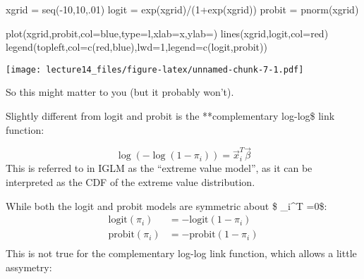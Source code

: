 \documentclass[
]{article}
\newenvironment{Shaded}{\begin{snugshade}}{\end{snugshade}}
\newcommand{\AttributeTok}[1]{\textcolor[rgb]{0.77,0.63,0.00}{#1}}
\newcommand{\DecValTok}[1]{\textcolor[rgb]{0.00,0.00,0.81}{#1}}
\newcommand{\FunctionTok}[1]{\textcolor[rgb]{0.00,0.00,0.00}{#1}}
\newcommand{\NormalTok}[1]{#1}
\newcommand{\OtherTok}[1]{\textcolor[rgb]{0.56,0.35,0.01}{#1}}
\newcommand{\SpecialCharTok}[1]{\textcolor[rgb]{0.00,0.00,0.00}{#1}}
\newcommand{\StringTok}[1]{\textcolor[rgb]{0.31,0.60,0.02}{#1}}
\begin{document}
\begin{Shaded}
\begin{Highlighting}[]
\NormalTok{xgrid }\OtherTok{=} \FunctionTok{seq}\NormalTok{(}\SpecialCharTok{{-}}\DecValTok{10}\NormalTok{,}\DecValTok{10}\NormalTok{,.}\DecValTok{01}\NormalTok{)}
\NormalTok{logit }\OtherTok{=} \FunctionTok{exp}\NormalTok{(xgrid)}\SpecialCharTok{/}\NormalTok{(}\DecValTok{1}\SpecialCharTok{+}\FunctionTok{exp}\NormalTok{(xgrid))}
\NormalTok{probit }\OtherTok{=} \FunctionTok{pnorm}\NormalTok{(xgrid)}

\FunctionTok{plot}\NormalTok{(xgrid,probit,}\AttributeTok{col=}\StringTok{\textquotesingle{}blue\textquotesingle{}}\NormalTok{,}\AttributeTok{type=}\StringTok{\textquotesingle{}l\textquotesingle{}}\NormalTok{,}\AttributeTok{xlab=}\StringTok{\textquotesingle{}x\textquotesingle{}}\NormalTok{,}\AttributeTok{ylab=}\StringTok{\textquotesingle{}\textquotesingle{}}\NormalTok{)}
\FunctionTok{lines}\NormalTok{(xgrid,logit,}\AttributeTok{col=}\StringTok{\textquotesingle{}red\textquotesingle{}}\NormalTok{)}
\FunctionTok{legend}\NormalTok{(}\StringTok{\textquotesingle{}topleft\textquotesingle{}}\NormalTok{,}\AttributeTok{col=}\FunctionTok{c}\NormalTok{(}\StringTok{\textquotesingle{}red\textquotesingle{}}\NormalTok{,}\StringTok{\textquotesingle{}blue\textquotesingle{}}\NormalTok{),}\AttributeTok{lwd=}\DecValTok{1}\NormalTok{,}\AttributeTok{legend=}\FunctionTok{c}\NormalTok{(}\StringTok{\textquotesingle{}logit\textquotesingle{}}\NormalTok{,}\StringTok{\textquotesingle{}probit\textquotesingle{}}\NormalTok{))}
\end{Highlighting}
\end{Shaded}

\texttt{[image: lecture14\_files/figure-latex/unnamed-chunk-7-1.pdf]}

So this might matter to you (but it probably won't).

Slightly different from logit and probit is the **complementary
log-log\$ link function:

\[
\log{(-\log{(1-\pi_i)} )} = \vec{x}_i^T \vec{\beta}
\] This is referred to in IGLM as the ``extreme value model'', as it can
be interpreted as the CDF of the extreme value distribution.

While both the logit and probit models are symmetric about \$
\_i\^{}T \vec{\beta}=0\$: \[
\begin{split}
\text{logit}(\pi_i) &= -\text{logit}(1-\pi_i) \\
\text{probit}(\pi_i) &= -\text{probit}(1-\pi_i) \\
\end{split}
\] This is not true for the complementary log-log link function, which
allows a little assymetry:
\end{document}
